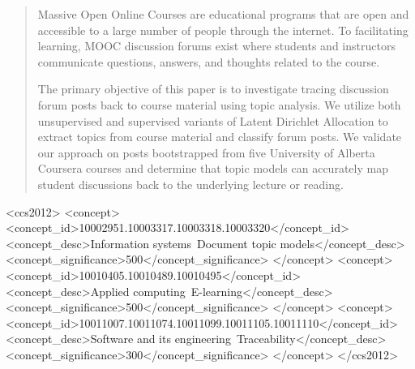 \documentclass[sigconf, anonymous]{acmart}
\begin{document}
%
\begin{abstract}
Massive Open Online Courses are educational programs that are open and accessible to a large number of people through the internet.
To facilitating learning, MOOC discussion forums exist where students and instructors communicate questions, answers, and thoughts related to the course.

The primary objective of this paper is to investigate tracing discussion forum posts back to course material using topic analysis. %
We utilize both unsupervised and supervised variants of Latent Dirichlet Allocation to extract topics from course material and classify forum posts.
We validate our approach on posts bootstrapped from five University of Alberta Coursera courses and determine that topic models can accurately map student discussions back to the underlying lecture or reading.

\end{abstract}

\begin{CCSXML}
<ccs2012>
<concept>
<concept_id>10002951.10003317.10003318.10003320</concept_id>
<concept_desc>Information systems~Document topic models</concept_desc>
<concept_significance>500</concept_significance>
</concept>
<concept>
<concept_id>10010405.10010489.10010495</concept_id>
<concept_desc>Applied computing~E-learning</concept_desc>
<concept_significance>500</concept_significance>
</concept>
<concept>
<concept_id>10011007.10011074.10011099.10011105.10011110</concept_id>
<concept_desc>Software and its engineering~Traceability</concept_desc>
<concept_significance>300</concept_significance>
</concept>
</ccs2012>
\end{CCSXML}
\end{document}
